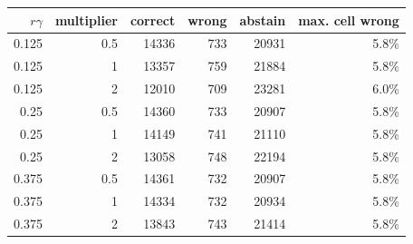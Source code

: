 \begin{tabular}{@{}rrrrrr@{}}
\toprule
$r\gamma$ & multiplier & correct & wrong & abstain & max. cell wrong\\
\midrule
0.125 & 0.5 & 14336 & 733 & 20931 & 5.8\%\\
0.125 & 1 & 13357 & 759 & 21884 & 5.8\%\\
0.125 & 2 & 12010 & 709 & 23281 & 6.0\%\\
0.25 & 0.5 & 14360 & 733 & 20907 & 5.8\%\\
0.25 & 1 & 14149 & 741 & 21110 & 5.8\%\\
0.25 & 2 & 13058 & 748 & 22194 & 5.8\%\\
0.375 & 0.5 & 14361 & 732 & 20907 & 5.8\%\\
0.375 & 1 & 14334 & 732 & 20934 & 5.8\%\\
0.375 & 2 & 13843 & 743 & 21414 & 5.8\%\\
\bottomrule
\end{tabular}
